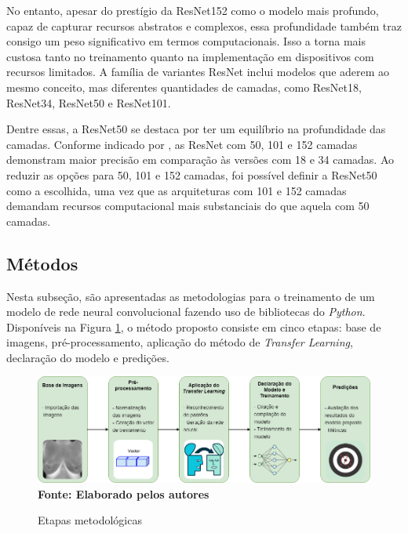 No entanto, apesar do prestígio da ResNet152 como o modelo mais profundo, capaz de capturar recursos abstratos e complexos, essa profundidade também traz consigo um peso significativo em termos computacionais. Isso a torna mais custosa tanto no treinamento quanto na implementação em dispositivos com recursos limitados. A família de variantes ResNet inclui modelos que aderem ao mesmo conceito, mas diferentes quantidades de camadas, como ResNet18, ResNet34, ResNet50 e ResNet101. 

Dentre essas, a ResNet50 se destaca por ter um equilíbrio na profundidade das camadas. Conforme indicado por , as ResNet com 50, 101 e 152 camadas demonstram maior precisão em comparação às versões com 18 e 34 camadas. Ao reduzir as opções para 50, 101 e 152 camadas, foi possível definir a ResNet50 como a escolhida, uma vez que as arquiteturas com 101 e 152 camadas demandam recursos computacional mais substanciais do que aquela com 50 camadas.





\subsection{\esp Métodos} \label{metodos}

Nesta subseção, são apresentadas as metodologias para o treinamento de um modelo de rede neural convolucional fazendo uso de bibliotecas do \textit{Python}. Disponíveis na Figura \ref{fig:diagrama}, o método proposto consiste em cinco etapas: base de imagens, pré-processamento, aplicação do método de \textit{Transfer Learning}, declaração do modelo e predições.

\begin{figure}[ht]
 	\centering	
 	\caption[\hspace{0.1cm}Grade Computacional.]{Etapas metodológicas}
 	\vspace{-0.2cm}
 	\includegraphics[width=1\textwidth]{figuras/tcc_diagrama.drawio.png}
    \captionsetup{justification=centering}
  \vspace{-0.2cm}
     \\\textbf{\footnotesize Fonte: Elaborado pelos autores}
	\label{fig:diagrama}
\end{figure}



